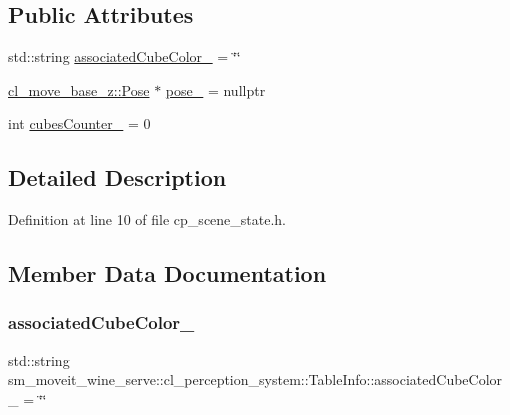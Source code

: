 \subsection*{Public Attributes}
\begin{DoxyCompactItemize}
\item 
std\+::string \hyperlink{structsm__moveit__wine__serve_1_1cl__perception__system_1_1TableInfo_ad25101aefe2aeb72c9c5495e7cffd120}{associated\+Cube\+Color\+\_\+} = \char`\"{}\char`\"{}
\item 
\hyperlink{classcl__move__base__z_1_1Pose}{cl\+\_\+move\+\_\+base\+\_\+z\+::\+Pose} $\ast$ \hyperlink{structsm__moveit__wine__serve_1_1cl__perception__system_1_1TableInfo_ac3317a85ede986382fb2a88a38006482}{pose\+\_\+} = nullptr
\item 
int \hyperlink{structsm__moveit__wine__serve_1_1cl__perception__system_1_1TableInfo_a315d838f8f9a002f04b5302546d27702}{cubes\+Counter\+\_\+} = 0
\end{DoxyCompactItemize}


\subsection{Detailed Description}


Definition at line 10 of file cp\+\_\+scene\+\_\+state.\+h.



\subsection{Member Data Documentation}
\mbox{\label{structsm__moveit__wine__serve_1_1cl__perception__system_1_1TableInfo_ad25101aefe2aeb72c9c5495e7cffd120}} 
\subsubsection{\texorpdfstring{associated\+Cube\+Color\+\_\+}{associatedCubeColor\_}}
{\footnotesize\ttfamily std\+::string sm\+\_\+moveit\+\_\+wine\+\_\+serve\+::cl\+\_\+perception\+\_\+system\+::\+Table\+Info\+::associated\+Cube\+Color\+\_\+ = \char`\"{}\char`\"{}}



